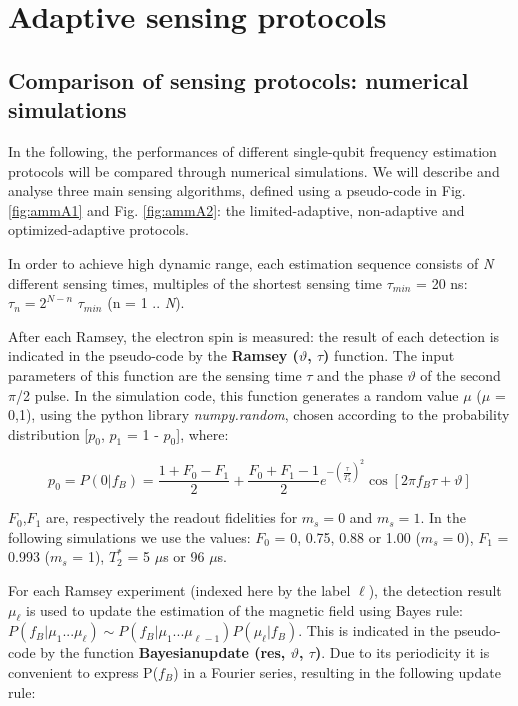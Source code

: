 \graphicspath{{./ch_adptv_msmnt_magnetometry_SI/figures/}}

\chapter[Adaptive sensing protocols]{Adaptive sensing protocols}
\label{ch:AMMappendix}

\section{Comparison of sensing protocols: numerical simulations}
\label{sec:comparisonprotocols}
In the following, the performances of different single-qubit frequency estimation protocols will be compared through numerical simulations. We will describe and analyse three main sensing algorithms, defined using a pseudo-code in Fig. \ref{fig:ammA1} and Fig. \ref{fig:ammA2}: the limited-adaptive, non-adaptive and optimized-adaptive protocols.

In order to achieve high dynamic range, each estimation sequence consists of \textit{N} different sensing times, multiples of the shortest sensing time $\tau_{min}$ = 20 ns: $\tau_n = 2^{N-n}$ $\tau_{min}$ (n = 1 .. \textit{N}).

After each Ramsey, the electron spin is measured: the result of each detection is indicated in the pseudo-code by the \textbf{Ramsey ($\vartheta$, $\tau$) }function. The input parameters of this function are the sensing time $\tau$ and the phase $\vartheta$ of the second $\pi$/2 pulse. In the simulation code, this function generates a random value $\mu$ ($\mu$ = 0,1), using the python library \textit{numpy.random}, chosen according to the probability distribution [$p_0$, $p_1$ = 1 - $p_0$], where:

\begin{equation}
p_0 = P(0|f_B) = \frac{1+F_0-F_1}{2}+\frac{F_0+F_1-1}{2}e^{-(\frac{\tau}{T_2^*})^2} \cos{[2\pi f_B \tau + \vartheta]}
\end{equation}

$F_0$,$F_1$  are, respectively the readout fidelities for $m_s = 0$ and $m_s = 1$. In the following simulations we use the values: $F_0$ = 0, 0.75, 0.88 or 1.00 ($m_s = 0$), $F_1$  = 0.993 ($m_s$ = 1), $T_2^*$ = 5 $\mu$s  or 96 $\mu$s.

For each Ramsey experiment (indexed here by the label $\ell$), the detection result $\mu_{\ell}$  is used to update the estimation of the magnetic field using Bayes rule: $P(f_B|\mu_1... \mu_{\ell}) \sim P(f_B|\mu_1...\mu_{\ell -1}) P(\mu_{\ell}|f_B)$. This is indicated in the pseudo-code by the function \textbf{Bayesian\textunderscore update (res, $\vartheta$, $\tau$)}.
Due to its periodicity it is convenient to express P($f_B$) in a Fourier series, resulting in the following update rule:

